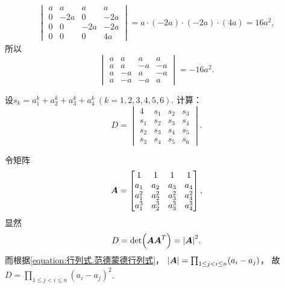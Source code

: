\begin{example}
\begin{solution}
\begin{gather*}
	\begin{vmatrix}
		a & a & a & a \\
		0 & -2 a & 0 & -2 a \\
		0 & 0 & -2 a & -2 a \\
		0 & 0 & 0 & 4 a
	\end{vmatrix}
	= a\cdot(-2a)\cdot(-2a)\cdot(4a) = 16a^2,
\end{gather*}
所以\begin{equation*}
	\begin{vmatrix}
		a & a & a & a \\
		a & a & -a & -a \\
		a & -a & a & -a \\
		a & -a & -a & a
	\end{vmatrix}
	= -16a^2.
\end{equation*}
\end{solution}
\end{example}

\begin{example}
设\(s_k = a_1^k + a_2^k + a_3^k + a_4^k\ (k=1,2,3,4,5,6)\).
计算：\begin{equation*}
	D = \begin{vmatrix}
		4 & s_1 & s_2 & s_3 \\
		s_1 & s_2 & s_3 & s_4 \\
		s_2 & s_3 & s_4 & s_5 \\
		s_3 & s_4 & s_5 & s_6
	\end{vmatrix}.
\end{equation*}
\begin{solution}
令矩阵\begin{equation*}
	\boldsymbol{A} = \begin{bmatrix}
		1 & 1 & 1 & 1 \\
		a_1 & a_2 & a_3 & a_4 \\
		a_1^2 & a_2^2 & a_3^2 & a_4^2 \\
		a_1^3 & a_2^3 & a_3^3 & a_4^3
	\end{bmatrix},
\end{equation*}
显然\begin{equation*}
	D = \det(\boldsymbol{A} \boldsymbol{A}^T) = \abs{\boldsymbol{A}}^2.
\end{equation*}
而根据\cref{equation:行列式.范德蒙德行列式}，
\(\abs{\boldsymbol{A}}
= \prod_{1 \leq j < i \leq n} (a_i - a_j)\)，
故\(D = \prod_{1 \leq j < i \leq n} (a_i - a_j)^2\).
\end{solution}
\end{example}
